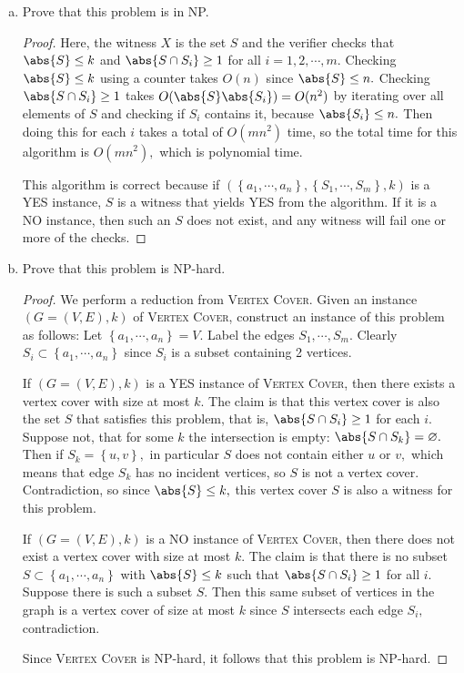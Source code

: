 \documentclass{article}
\begin{document}
\begin{enumerate}[(a)]
	\item Prove that this problem is in NP.
		\begin{proof}
			Here, the witness $X$ is the set $S$ and the verifier checks that $\abs{S}\le k$ and $\abs{S\cap S_i}\ge 1$ for all $i=1, 2, \cdots, m.$ Checking $\abs{S}\le k$ using a counter takes $O(n)$ since $\abs{S}\le n.$ Checking $\abs{S\cap S_i}\ge 1$ takes $O(\abs{S}\abs{S_i})=O(n^2)$ by iterating over all elements of $S$ and checking if $S_i$ contains it, because $\abs{S_i}\le n.$ Then doing this for each $i$ takes a total of $O(mn^2)$ time, so the total time for this algorithm is $O(mn^2),$ which is polynomial time.

			This algorithm is correct because if $(\left\{ a_1, \cdots, a_n \right\}, \left\{ S_1, \cdots, S_m \right\}, k)$ is a YES instance, $S$ is a witness that yields YES from the algorithm. If it is a NO instance, then such an $S$ does not exist, and any witness will fail one or more of the checks.
		\end{proof}

	\item Prove that this problem is NP-hard.
		\begin{proof}
			We perform a reduction from \textsc{Vertex Cover}. Given an instance $(G=(V, E), k)$ of \textsc{Vertex Cover}, construct an instance of this problem as follows: Let $\left\{ a_1, \cdots, a_n \right\}=V.$ Label the edges $S_1, \cdots, S_m.$ Clearly $S_i\subset \left\{ a_1, \cdots, a_n \right\}$ since $S_i$ is a subset containing 2 vertices. 

			If $(G=(V, E), k)$ is a YES instance of \textsc{Vertex Cover}, then there exists a vertex cover with size at most $k.$ The claim is that this vertex cover is also the set $S$ that satisfies this problem, that is, $\abs{S\cap S_i}\ge 1$ for each $i.$ Suppose not, that for some $k$ the intersection is empty: $\abs{S\cap S_k}=\varnothing.$ Then if $S_k=\left\{ u, v \right\},$ in particular $S$ does not contain either $u$ or $v,$ which means that edge $S_k$ has no incident vertices, so $S$ is not a vertex cover. Contradiction, so since $\abs{S}\le k,$ this vertex cover $S$ is also a witness for this problem.

			If $(G=(V, E), k)$ is a NO instance of \textsc{Vertex Cover}, then there does not exist a vertex cover with size at most $k.$ The claim is that there is no subset $S\subset\left\{ a_1, \cdots, a_n \right\}$ with $\abs{S}\le k$ such that $\abs{S\cap S_i}\ge 1$ for all $i.$ Suppose there is such a subset $S.$ Then this same subset of vertices in the graph is a vertex cover of size at most $k$ since $S$ intersects each edge $S_i,$ contradiction.

			Since \textsc{Vertex Cover} is NP-hard, it follows that this problem is NP-hard.
		\end{proof}
		
\end{enumerate}
\end{document}
